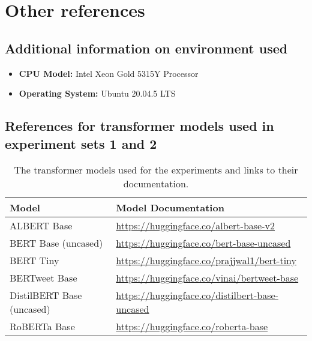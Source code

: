 
\chapter{Other references}

\section{Additional information on environment used}
\begin{itemize}
    \small
    \item \textbf{CPU Model:} Intel Xeon Gold 5315Y Processor
    \item \textbf{Operating System:} Ubuntu 20.04.5 LTS
\end{itemize}

\section{References for transformer models used in experiment sets 1 and 2}
\begin{table}[ht]
    \captionsetup{font=small}
    \centering
    \begin{tabularx}{\textwidth}{|l|X|}
        \hline
        \rowcolor[gray]{0.7}
        \textbf{Model}            & \textbf{Model Documentation}                                   \\
        \hline

        ALBERT Base               & \small{\url{https://huggingface.co/albert-base-v2}}            \\
        \hline
        BERT Base (uncased)       & \small{\url{https://huggingface.co/bert-base-uncased}}         \\
        \hline
        BERT Tiny                 & \small{\url{https://huggingface.co/prajjwal1/bert-tiny}}       \\
        \hline
        BERTweet Base             & \small{\url{https://huggingface.co/vinai/bertweet-base}}       \\
        \hline
        DistilBERT Base (uncased) & \small{\url{https://huggingface.co/distilbert-base-uncased}}   \\
        \hline
        RoBERTa Base              & \small{\url{https://huggingface.co/roberta-base}}              \\
        \hline
    \end{tabularx}
    \caption{The transformer models used for the experiments and links to their documentation.}
    \label{tab: apdxb_model_doc}
\end{table}

